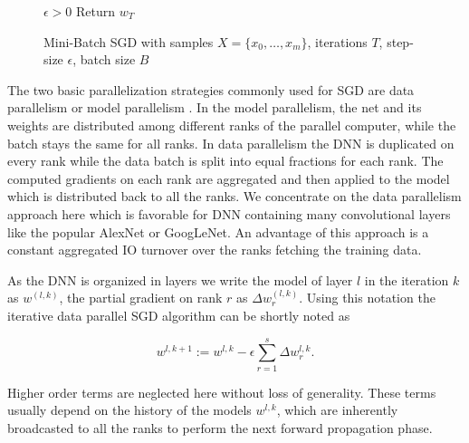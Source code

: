 \documentclass[twoside,twocolumn]{article}
\begin{document}
\begin{figure}[htbp]
\centering%
\begin{algorithmic}[1]
\REQUIRE $\epsilon>0$
\ENDFOR
{}
\ENDFOR
\STATE Return $w_T$
\end{algorithmic}
\caption{Mini-Batch SGD
with samples $X=\{x_0,\dots,x_m\}$, iterations $T$, step-size
$\epsilon$, batch size $B$ \label{fig:algo_mini}}
\end{figure}


The two basic parallelization strategies commonly used for SGD
are data parallelism or model parallelism \cite{KeuperDL}.
In the model parallelism, the net and its weights are distributed among different ranks
of the parallel computer, while the batch stays the same for all ranks.
In data parallelism the DNN is duplicated on every rank while the data batch
is split into equal fractions for each rank. The computed gradients on each rank
are aggregated and then applied to the model which is distributed back to all the ranks.
We concentrate on the data parallelism approach here which is favorable for
DNN containing many convolutional layers like the popular AlexNet or GoogLeNet.
An advantage of this approach is a constant aggregated IO turnover over
the ranks fetching the training data.


As the DNN is organized in layers we write the model of layer $l$ in
 the iteration $k$ as $w^{(l,k)}$, the partial gradient on rank $r$ as
$\Delta w^{(l,k)}_r$. Using this notation the iterative data parallel 
SGD algorithm can be shortly noted as

\begin{equation}
w^{l,k+1} :=  w^{l,k} -  \epsilon \sum_{r=1}^s\Delta w^{l,k}_r.
\end{equation}

Higher order terms are neglected here without loss of generality. These terms
usually depend on the history of the models $w^{l,k}$,
which are inherently broadcasted
to all the ranks to perform the next forward propagation phase.
\end{document}
